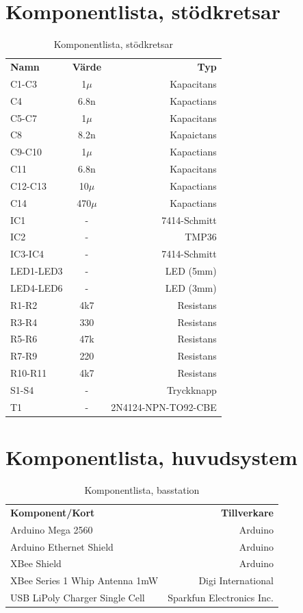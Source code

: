 \documentclass[a4paper,11pt]{article}
\begin{document}
\section{Komponentlista, stödkretsar}

\begin{table}[h]
\centering
	\begin{tabular}{|l|c|r|}
	{\bf Namn} & {\bf Värde} & {\bf Typ} \\
	C1-C3			& 1$\mu$	& Kapacitans \\
	C4			& 6.8n		& Kapactians \\		
	C5-C7			& 1$\mu$	& Kapacitans \\
	C8			& 8.2n		& Kapaictans \\
	C9-C10			& 1$\mu$	& Kapactians \\
	C11			& 6.8n		& Kapacitans \\
	C12-C13			& 10$\mu$	& Kapactians \\
	C14			& 470$\mu$	& Kapactians \\
	IC1			& -		& 7414-Schmitt \\
	IC2			& -		& TMP36 \\
	IC3-IC4			& -		& 7414-Schmitt \\
	LED1-LED3		& -		& LED (5mm) \\
	LED4-LED6		& -		& LED (3mm) \\
	R1-R2			& 4k7		& Resistans \\
	R3-R4			& 330		& Resistans \\
	R5-R6			& 47k		& Resistans \\
	R7-R9			& 220		& Resistans \\
	R10-R11			& 4k7		& Resistans \\
	S1-S4			& -		& Tryckknapp \\
	T1                      & -		& 2N4124-NPN-TO92-CBE \\
	\end{tabular}
\caption{Komponentlista, stödkretsar}
\label{tab:komponenttable}
\end{table}
\pagebreak

\section{Komponentlista, huvudsystem}

\begin{table}[h]
\centering
	\begin{tabular}{|l|r|}
	{\bf Komponent/Kort} & {\bf Tillverkare} \\
	Arduino Mega 2560                  & Arduino \\
	Arduino Ethernet Shield            & Arduino \\
	XBee Shield                        & Arduino \\
	XBee Series 1 Whip Antenna 1mW     & Digi International \\
	USB LiPoly Charger Single Cell     & Sparkfun Electronics Inc. \\
	\end{tabular}
\caption{Komponentlista, basstation}
\label{tab:korttable_bas}
\end{table}
\end{document}
